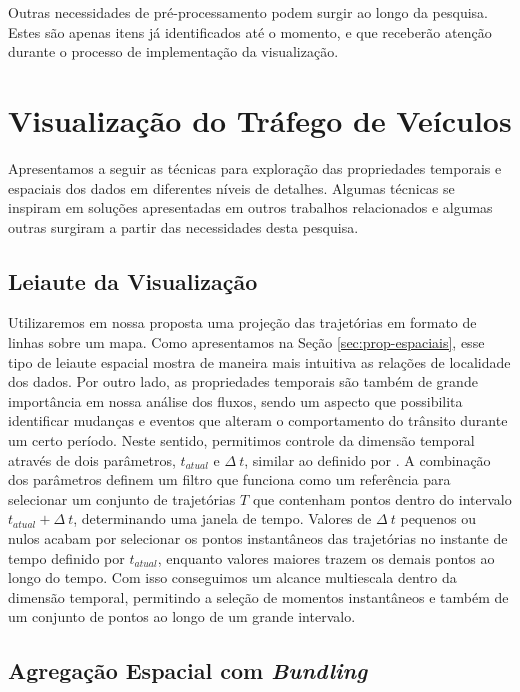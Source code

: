   Outras necessidades de pré-processamento podem surgir ao longo da pesquisa.
Estes são apenas itens já identificados até o momento, e que receberão atenção
durante o processo de implementação da visualização.

\section{Visualização do Tráfego de Veículos}

  Apresentamos a seguir as técnicas para exploração das propriedades temporais
e espaciais dos dados em diferentes níveis de detalhes. Algumas técnicas se
inspiram em soluções apresentadas em outros trabalhos relacionados e algumas
outras surgiram a partir das necessidades desta pesquisa.

\subsection{Leiaute da Visualização}
  
  Utilizaremos em nossa proposta uma projeção das trajetórias em formato de
linhas sobre um mapa.  Como apresentamos na Seção \ref{sec:prop-espaciais},
esse tipo de leiaute espacial mostra de maneira mais intuitiva as relações de
localidade dos dados. Por outro lado, as propriedades temporais são também de
grande importância em nossa análise dos fluxos, sendo um aspecto que
possibilita identificar mudanças e eventos que alteram o comportamento do
trânsito durante um certo período.  Neste sentido, permitimos controle da
dimensão temporal através de dois parâmetros, $t_{atual}$ e $\Delta~t$, similar
ao definido por \citet{Klein2014}.  A combinação dos parâmetros definem um
filtro que funciona como um referência para selecionar um conjunto de
trajetórias  ${T}$ que contenham pontos dentro do intervalo $t_{atual} +
\Delta~t$, determinando uma janela de tempo. Valores de $\Delta~t$ pequenos ou
nulos acabam por selecionar os pontos instantâneos das trajetórias no instante
de tempo definido por $t_{atual}$, enquanto valores maiores trazem os demais
pontos ao longo do tempo. Com isso conseguimos um alcance multiescala dentro
da dimensão temporal, permitindo a seleção de momentos instantâneos e também de
um conjunto de pontos ao longo de um grande intervalo.

\subsection{Agregação Espacial com \emph{Bundling}}

